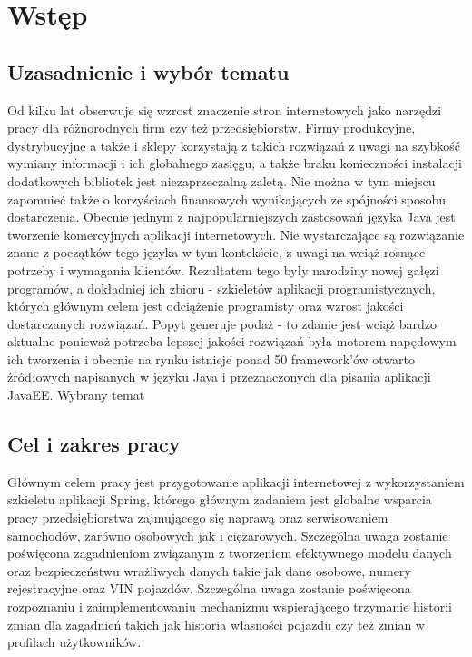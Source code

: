 \chapter{Wstęp}
\label{chaper:introduction}

\section{Uzasadnienie i wybór tematu}
	Od kilku lat obserwuje się wzrost znaczenie stron internetowych jako narzędzi pracy dla różnorodnych firm czy też przedsiębiorstw. Firmy produkcyjne, dystrybucyjne a także i sklepy korzystają z takich rozwiązań z uwagi na szybkość wymiany informacji i ich globalnego zasięgu, a także braku konieczności instalacji dodatkowych bibliotek jest niezaprzeczalną zaletą. Nie można w tym miejscu zapomnieć także o korzyściach finansowych wynikających ze spójności sposobu dostarczenia. 
	Obecnie jednym z najpopularniejszych zastosowań języka Java jest tworzenie komercyjnych aplikacji internetowych. Nie wystarczające są rozwiązanie znane z początków tego języka w tym kontekście, z uwagi na wciąż rosnące potrzeby i wymagania klientów. Rezultatem tego były narodziny nowej gałęzi programów, a dokładniej ich zbioru - szkieletów aplikacji programistycznych, których głównym celem jest odciążenie programisty oraz wzrost jakości dostarczanych rozwiązań. Popyt generuje podaż - to zdanie jest wciąż bardzo aktualne ponieważ potrzeba lepszej jakości rozwiązań była motorem napędowym ich tworzenia i obecnie na rynku istnieje ponad 50 framework'ów otwarto źródłowych napisanych w języku Java i przeznaczonych dla pisania aplikacji JavaEE. 
	Wybrany temat 
\section{Cel i zakres pracy}
	Głównym celem pracy jest przygotowanie aplikacji internetowej z wykorzystaniem szkieletu aplikacji Spring, którego głównym zadaniem
	jest globalne wsparcia pracy przedsiębiorstwa zajmującego się naprawą oraz serwisowaniem samochodów, zarówno osobowych jak i ciężarowych.
	Szczególna uwaga zostanie poświęcona zagadnieniom związanym z tworzeniem efektywnego modelu danych oraz bezpieczeństwu wrażliwych danych takie jak dane osobowe, numery rejestracyjne oraz VIN pojazdów. Szczególna uwaga zostanie poświęcona rozpoznaniu i zaimplementowaniu mechanizmu wspierającego trzymanie
	historii zmian dla zagadnień takich jak historia własności pojazdu czy też zmian w profilach użytkowników.
	